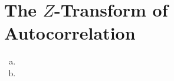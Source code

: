 \section{The $Z$-Transform of Autocorrelation}\label{sec:p4}

\begin{enumerate}[(a)]
	\item 
	\item 
\end{enumerate}